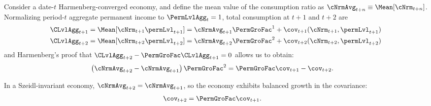 \documentclass[BufferStockTheory]{subfiles}
\begin{document}
Consider a date-$t$ Harmenberg-converged economy, and define the mean value of the consumption ratio as $\cNrmAvg_{t+n} \equiv \Mean[\cNrm_{t+n}]$.  Normalizing period-$t$ aggregate permanent income to $\PermLvlAgg_{t}=1$, total consumption at $t+1$ and $t+2$ are
\begin{equation}\label{eq:atp2vsatp1}
  \begin{split}
    \CLvlAgg_{t+1} & = \Mean[\cNrm_{t+1}\permLvl_{t+1}] = \cNrmAvg_{t+1}\PermGroFac^{1} + \cov_{t+1}(\cNrm_{t+1}, \permLvl_{t+1})
    \\  \CLvlAgg_{t+2} & = \Mean[\cNrm_{t+2}\permLvl_{t+2}] = \cNrmAvg_{t+2}\PermGroFac^{2} + \cov_{t+2}(\cNrm_{t+2}, \permLvl_{t+2})
  \end{split}
\end{equation}
and Harmenberg's proof that $\CLvlAgg_{t+2}-\PermGroFac \CLvlAgg_{t+1}=0$ allows us to obtain:
\begin{equation} \label{eq:cNrmvsCov}\begin{split}
    \left(\cNrmAvg_{t+2} - \cNrmAvg_{t+1}\right)\PermGroFac^{2} & = \PermGroFac \cov_{t+1} - \cov_{t+2} .
  \end{split}\end{equation}

In a Szeidl-invariant economy, $\cNrmAvg_{t+2} = \cNrmAvg_{t+1}$, so the economy exhibits balanced growth in the covariance:
\begin{align}
  \cov_{t+2} & = \PermGroFac \cov_{t+1}.
\end{align}
\end{document}
